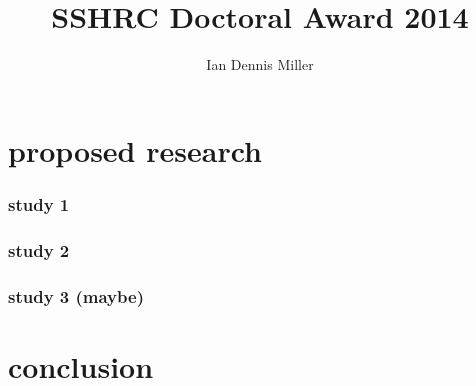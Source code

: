 \documentclass[man,apacite,donotrepeattitle,noextraspace,12pt]{apa6}
\title{SSHRC Doctoral Award 2014}
\author{Ian Dennis Miller}
\affiliation{University of Toronto}
\begin{document}
\thispagestyle{fancy}
\setlength{\parindent}{20pt}
\singlespacing



\lipsum[1]



\lipsum[2]



\lipsum[3]

\section{proposed research}



\lipsum[4]

\subsubsection{study 1}

\lipsum[5]

\subsubsection{study 2}

\lipsum[6]

\subsubsection{study 3 (maybe)}

\lipsum[7]

\section{conclusion}
\end{document}
